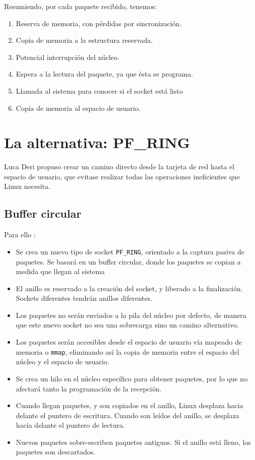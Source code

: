 Resumiendo, por cada paquete recibido, tenemos:
\begin{enumerate}
 \item Reserva de memoria, con pérdidas por sincronización.
 \item Copia de memoria a la estructura reservada.
 \item Potencial interrupción del núcleo.
 \item Espera a la lectura del paquete, ya que ésta se programa.
 \item Llamada al sistema para conocer si el socket está listo
 \item Copia de memoria al espacio de usuario.
\end{enumerate}

\section{La alternativa: PF\_RING}
Luca Deri propuso crear un camino directo desde la tarjeta de red hasta el espacio de usuario, que evitase realizar 
todas las operaciones ineficientes que Linux necesita. %

\subsection{Buffer circular}
Para ello \cite{beyondDevicePolling}:

\begin{itemize}
  \item Se crea un nuevo tipo de socket \texttt{PF\_RING}, orientado a la captura pasiva de paquetes. Se basará 
en un buffer circular, donde los paquetes se copian a medida que llegan al sistema
  \item El anillo es reservado a la creación del socket, y liberado a la finalización. Sockets diferentes tendrán 
anillos diferentes.
  \item Los paquetes no serán enviados a la pila del núcleo por defecto, de manera que este nuevo socket no sea una 
sobrecarga sino un camino alternativo.
  \item Los paquetes serán accesibles desde el espacio de usuario vía mapeado de memoria o \texttt{mmap}, 
eliminando así la copia de memoria entre el espacio del núcleo y el espacio de usuario.
  \item Se crea un hilo en el núcleo específico para obtener paquetes, por lo que no afectará tanto la programación de 
la recepción.
  \item Cuando llegan paquetes, y son copiados en el anillo, Linux desplaza hacia delante el puntero de escritura. 
Cuando son leídos del anillo, se desplaza hacia delante el puntero de lectura.
  \item Nuevos paquetes sobre-escriben paquetes antiguos. Si el anillo está lleno, los paquetes son descartados.
\end{itemize}

